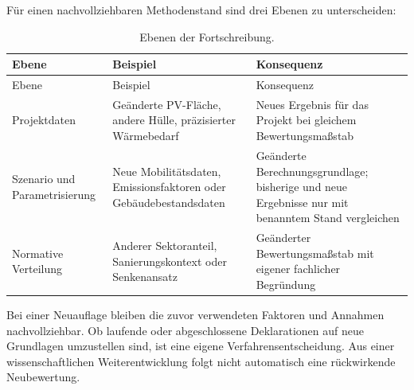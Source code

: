 \documentclass[
  ngerman,
  a4paper,
  DIV=11]{scrreprt}
\begin{document}
Für einen nachvollziehbaren Methodenstand sind drei Ebenen zu
unterscheiden:

\begin{longtable}[]{@{}
  >{\raggedright\arraybackslash}p{}
  >{\raggedright\arraybackslash}p{}
  >{\raggedright\arraybackslash}p{}@{}}
\caption{Ebenen der
Fortschreibung.}\label{tbl-fortschreibung}\tabularnewline
\toprule\noalign{}
\begin{minipage}[b]{\linewidth}\raggedright
Ebene
\end{minipage} & \begin{minipage}[b]{\linewidth}\raggedright
Beispiel
\end{minipage} & \begin{minipage}[b]{\linewidth}\raggedright
Konsequenz
\end{minipage} \\
\midrule\noalign{}
\endfirsthead
\toprule\noalign{}
\begin{minipage}[b]{\linewidth}\raggedright
Ebene
\end{minipage} & \begin{minipage}[b]{\linewidth}\raggedright
Beispiel
\end{minipage} & \begin{minipage}[b]{\linewidth}\raggedright
Konsequenz
\end{minipage} \\
\midrule\noalign{}
\endhead
\bottomrule\noalign{}
\endlastfoot
Projektdaten & Geänderte PV-Fläche, andere Hülle, präzisierter
Wärmebedarf & Neues Ergebnis für das Projekt bei gleichem
Bewertungsmaßstab \\
Szenario und Parametrisierung & Neue Mobilitätsdaten, Emissionsfaktoren
oder Gebäudebestandsdaten & Geänderte Berechnungsgrundlage; bisherige
und neue Ergebnisse nur mit benanntem Stand vergleichen \\
Normative Verteilung & Anderer Sektoranteil, Sanierungskontext oder
Senkenansatz & Geänderter Bewertungsmaßstab mit eigener fachlicher
Begründung \\
\end{longtable}

Bei einer Neuauflage bleiben die zuvor verwendeten Faktoren und Annahmen
nachvollziehbar. Ob laufende oder abgeschlossene Deklarationen auf neue
Grundlagen umzustellen sind, ist eine eigene Verfahrensentscheidung. Aus
einer wissenschaftlichen Weiterentwicklung folgt nicht automatisch eine
rückwirkende Neubewertung.
\end{document}
